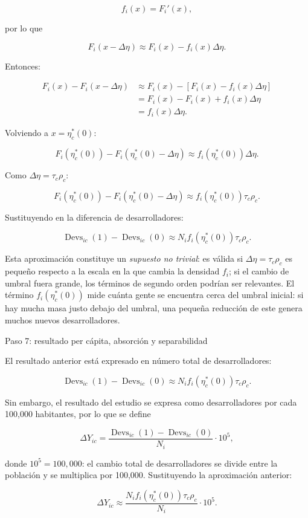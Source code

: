 \documentclass[12pt,a4paper]{article}
\let\textbf\textmd
\newcommand{\Devs}{\operatorname{Devs}}
\begin{document}
\[
f_i(x)=F_i'(x),
\]

por lo que

\[
F_i(x-\Delta\eta)
\approx
F_i(x)-f_i(x)\Delta\eta.
\]

Entonces:

\begin{align*}
F_i(x)-F_i(x-\Delta\eta)
&\approx
F_i(x)-\left[F_i(x)-f_i(x)\Delta\eta\right]\\
&=
F_i(x)-F_i(x)+f_i(x)\Delta\eta\\
&=
f_i(x)\Delta\eta.
\end{align*}

Volviendo a $x=\eta_c^*(0)$:

\[
F_i(\eta_c^*(0))
-F_i(\eta_c^*(0)-\Delta\eta)
\approx
f_i(\eta_c^*(0))\Delta\eta.
\]

Como $\Delta\eta=\tau_c\rho_c$:

\[
F_i(\eta_c^*(0))
-F_i(\eta_c^*(0)-\Delta\eta)
\approx
f_i(\eta_c^*(0))\tau_c\rho_c.
\]

Sustituyendo en la diferencia de desarrolladores:

\[
\Devs_{ic}(1)-\Devs_{ic}(0)
\approx
N_i f_i(\eta_c^*(0))\tau_c\rho_c.
\]

Esta aproximación constituye un \textit{supuesto no trivial}: es válida si $\Delta\eta=\tau_c\rho_c$ es pequeño respecto a la escala en la que cambia la densidad $f_i$; si el cambio de umbral fuera grande, los términos de segundo orden podrían ser relevantes. El término $f_i(\eta_c^*(0))$ mide cuánta gente se encuentra cerca del umbral inicial: si hay mucha masa justo debajo del umbral, una pequeña reducción de este genera muchos nuevos desarrolladores.

\bigskip
\noindent\textbf{Paso 7: resultado per cápita, absorción y separabilidad}

\medskip
\noindent El resultado anterior está expresado en número total de desarrolladores:

\[
\Devs_{ic}(1)-\Devs_{ic}(0)
\approx
N_i f_i(\eta_c^*(0))\tau_c\rho_c.
\]

Sin embargo, el resultado del estudio se expresa como desarrolladores por cada 100,000 habitantes, por lo que se define

\[
\Delta Y_{ic}
=
\frac{\Devs_{ic}(1)-\Devs_{ic}(0)}{N_i}\cdot 10^5,
\]

donde $10^5=100{,}000$: el cambio total de desarrolladores se divide entre la población y se multiplica por 100,000. Sustituyendo la aproximación anterior:

\[
\Delta Y_{ic}
\approx
\frac{
N_i f_i(\eta_c^*(0))\tau_c\rho_c
}{N_i}
\cdot 10^5.
\]
\end{document}
